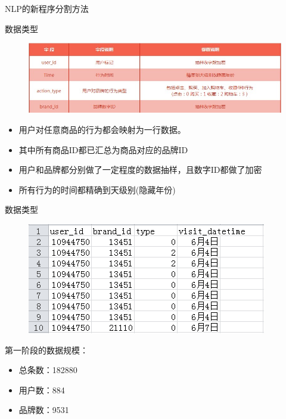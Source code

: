 \documentclass{beamer}
\begin{document}
\begin{frame}[t]{NLP的新程序分割方法}
	
	
\end{frame}








\begin{frame}{数据类型}

\begin{figure}
\includegraphics[width=\linewidth]{./data_info}
\end{figure}

\begin{itemize}
\item 用户对任意商品的行为都会映射为一行数据。
\item 其中所有商品ID都已汇总为商品对应的品牌ID
\item 用户和品牌都分别做了一定程度的数据抽样，且数字ID都做了加密
\item 所有行为的时间都精确到天级别(隐藏年份)
\end{itemize}

\end{frame}

\begin{frame}{数据类型}

\begin{figure}
\includegraphics{./data_details}
\end{figure}

第一阶段的数据规模：
\begin{itemize}
\item 总条数：182880
\item 用户数：884
\item 品牌数：9531 
\end{itemize}

\end{frame}
\end{document}
